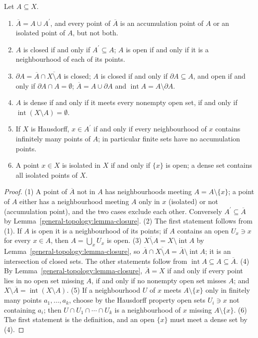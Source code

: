\begin{proposition}\label{general-topology:proposition-accumulation}
Let $A \subseteq X$.
\begin{enumerate}
\item $\overline{A} = A \cup A^{\prime}$, and every point of $\overline{A}$ is an accumulation point of $A$ or an isolated point of $A$, but not both.
\item $A$ is closed if and only if $A^{\prime} \subseteq A$; $A$ is open if and only if it is a neighbourhood of each of its points.
\item $\partial A = \overline{A} \cap \overline{X \setminus A}$ is closed; $A$ is closed if and only if $\partial A \subseteq A$, and open if and only if $\partial A \cap A = \emptyset$;
$\overline{A} = A \cup \partial A$ and $\operatorname{int}A = A \setminus \partial A$.
\item $A$ is dense if and only if it meets every nonempty open set, if and only if $\operatorname{int}(X \setminus A) = \emptyset$.
\item If $X$ is Hausdorff, $x \in A^{\prime}$ if and only if every neighbourhood of $x$ contains infinitely many points of $A$; in particular finite sets have no accumulation points.
\item A point $x \in X$ is isolated in $X$ if and only if $\{x\}$ is open; a dense set contains all isolated points of $X$.
\end{enumerate}
\end{proposition}

\begin{proof}
(1) A point of $\overline{A}$ not in $A$ has neighbourhoods meeting $A = A \setminus \{x\}$; a point of $A$ either has a neighbourhood meeting $A$ only in $x$ (isolated) or not (accumulation
point), and the two cases exclude each other. Conversely $A^{\prime} \subseteq \overline{A}$ by Lemma~\ref{general-topology:lemma-closure}. (2) The first statement follows from (1). If $A$ is open it
is a neighbourhood of its points; if $A$ contains an open $U_x \ni x$ for every $x \in A$, then $A = \bigcup_xU_x$ is open. (3) $\overline{X \setminus A} = X \setminus \operatorname{int}A$ by
Lemma~\ref{general-topology:lemma-closure}, so $\overline{A} \cap \overline{X \setminus A} = \overline{A} \setminus \operatorname{int}A$; it is an intersection of closed sets. The other statements
follow from $\operatorname{int}A \subseteq A \subseteq \overline{A}$. (4) By Lemma~\ref{general-topology:lemma-closure}, $\overline{A} = X$ if and only if every point lies in no open set missing $A$,
if and only if no nonempty open set misses $A$; and $X \setminus \overline{A} = \operatorname{int}(X \setminus A)$. (5) If a neighbourhood $U$ of $x$ meets $A \setminus \{x\}$ only in finitely
many points $a_1, \ldots, a_k$, choose by the Hausdorff property open sets $U_i \ni x$ not containing $a_i$; then $U \cap U_1 \cap \cdots \cap U_k$ is a neighbourhood of $x$ missing
$A \setminus \{x\}$. (6) The first statement is the definition, and an open $\{x\}$ must meet a dense set by (4).
\end{proof}


